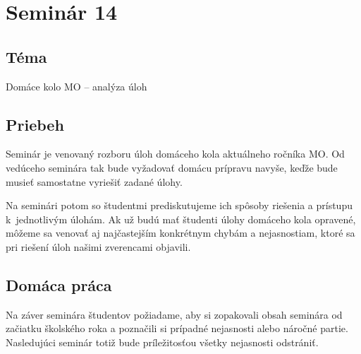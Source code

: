\section*{Seminár 14}


\subsection*{Téma}
Domáce kolo MO -- analýza úloh

\subsection*{Priebeh}
Seminár je venovaný rozboru úloh domáceho kola aktuálneho ročníka MO. Od vedúceho seminára tak bude vyžadovať domácu prípravu navyše, keďže bude musieť samostatne vyriešiť zadané úlohy.

Na seminári potom so študentmi prediskutujeme ich spôsoby riešenia a prístupu k~jednotlivým úlohám. Ak už budú mať študenti úlohy domáceho kola opravené, môžeme sa venovať aj najčastejším konkrétnym chybám a nejasnostiam, ktoré sa pri riešení úloh našimi zverencami objavili.

\subsection*{Domáca práca}
Na záver seminára študentov požiadame, aby si zopakovali obsah seminára od začiatku školského roka a poznačili si prípadné nejasnosti alebo náročné partie. Nasledujúci seminár totiž bude príležitosťou všetky nejasnosti odstrániť.

